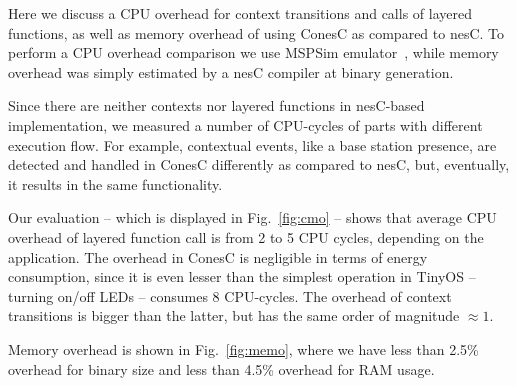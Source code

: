 Here we discuss a CPU overhead for context transitions and calls of layered
functions, as well as memory overhead of using ConesC as compared to nesC. To perform a CPU
overhead comparison we use MSPSim emulator~\cite{eriksson09}, while memory overhead was
simply estimated by a nesC compiler at binary generation.

Since there are neither contexts nor layered functions in nesC-based
implementation, we measured a number of CPU-cycles of parts with different
execution flow. For example, contextual events, like a base station presence,
are detected and handled in ConesC differently as compared to nesC, but,
eventually, it results in the same functionality. 

Our evaluation -- which is displayed in Fig.~\ref{fig:cmo} -- shows that average
CPU overhead of layered function call is from 2 to 5 CPU cycles, depending on the
application. The overhead in ConesC is negligible in terms of energy consumption,
since it is even lesser than the simplest operation in TinyOS -- turning on/off
LEDs -- consumes 8 CPU-cycles. The overhead of context transitions is bigger
than the latter, but has the same order of magnitude $\approx1$.

Memory overhead is shown in Fig.~\ref{fig:memo}, where we have less than 2.5\%
overhead for binary size and less than 4.5\% overhead for RAM usage.

